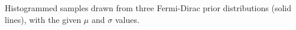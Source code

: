 \label{fig:priorfermidirac}
Histogrammed samples drawn from three Fermi-Dirac prior distributions (solid lines), with the given $\mu$ and $\sigma$ values.
